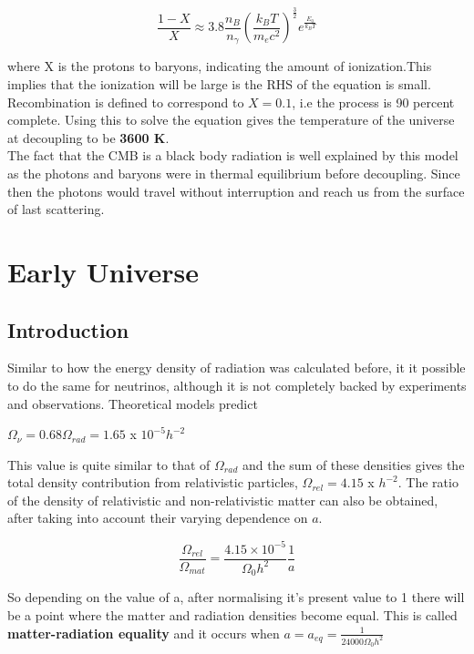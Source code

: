 \documentclass{article}
\begin{document}
\begin{equation}
    \frac{1-X}{X} \approx 3.8\frac{n_B}{n_{\gamma}}(\frac{k_{B}T}{m_{e}c^2})^{\frac{3}{2}}e^{\frac{E_0}{k_{B}T}}
\end{equation}

where X is the protons to baryons, indicating the amount of ionization.This implies that the ionization will be large is the RHS of the equation is small. Recombination is defined to correspond to $X = 0.1$, i.e the process is 90 percent complete. Using this to solve the equation gives the temperature of the universe at decoupling to be \textbf{3600 K}.
\\
The fact that the CMB is a black body radiation is well explained by this model as the photons and baryons were in thermal equilibrium before decoupling. Since then the photons would travel without interruption and reach us from the surface of last scattering.

\section{Early Universe}
\subsection{Introduction}
Similar to how the energy density of radiation was calculated before, it it possible to do the same for neutrinos, although it is not completely backed by experiments and observations. Theoretical models predict

\begin{center}
    $\Omega_{\nu} = 0.68\Omega_{rad} = 1.65$ x $10^{-5}h^{-2}$
\end{center}

This value is quite similar to that of $\Omega_{rad}$ and the sum of these densities gives the total density contribution from relativistic particles, $\Omega_{rel} = 4.15$ x $h^{-2}$.
The ratio of the density of relativistic and non-relativistic matter can also be obtained, after taking into account their varying dependence on $a$.

\begin{equation}
    \frac{\Omega_{rel}}{\Omega_{mat}} = \frac{4.15 \times 10^{-5}}{\Omega_{0}h^2}\frac{1}{a}
\end{equation}

So depending on the value of a, after normalising it's present value to 1 there will be a point where the matter and radiation densities become equal. This is called \textbf{matter-radiation equality} and it occurs when $a = a_{eq} = \frac{1}{24000\Omega_{0}h^2}$
\end{document}
